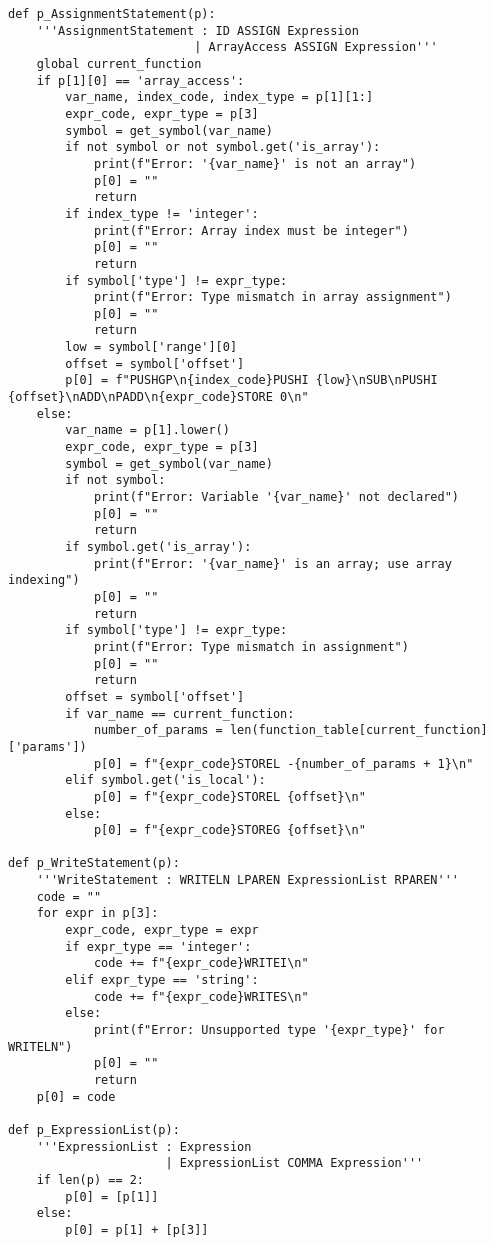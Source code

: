 \documentclass[12pt,a4paper]{report}%
\begin{document}
\begin{lstlisting}[style=pythonStyle, caption={Ficheiro lex.py}]
def p_AssignmentStatement(p):
    '''AssignmentStatement : ID ASSIGN Expression
                          | ArrayAccess ASSIGN Expression'''
    global current_function
    if p[1][0] == 'array_access':
        var_name, index_code, index_type = p[1][1:]
        expr_code, expr_type = p[3]
        symbol = get_symbol(var_name)
        if not symbol or not symbol.get('is_array'):
            print(f"Error: '{var_name}' is not an array")
            p[0] = ""
            return
        if index_type != 'integer':
            print(f"Error: Array index must be integer")
            p[0] = ""
            return
        if symbol['type'] != expr_type:
            print(f"Error: Type mismatch in array assignment")
            p[0] = ""
            return
        low = symbol['range'][0]
        offset = symbol['offset']
        p[0] = f"PUSHGP\n{index_code}PUSHI {low}\nSUB\nPUSHI {offset}\nADD\nPADD\n{expr_code}STORE 0\n"
    else:
        var_name = p[1].lower()
        expr_code, expr_type = p[3]
        symbol = get_symbol(var_name)
        if not symbol:
            print(f"Error: Variable '{var_name}' not declared")
            p[0] = ""
            return
        if symbol.get('is_array'):
            print(f"Error: '{var_name}' is an array; use array indexing")
            p[0] = ""
            return
        if symbol['type'] != expr_type:
            print(f"Error: Type mismatch in assignment")
            p[0] = ""
            return
        offset = symbol['offset']
        if var_name == current_function:
            number_of_params = len(function_table[current_function]['params'])
            p[0] = f"{expr_code}STOREL -{number_of_params + 1}\n"
        elif symbol.get('is_local'):
            p[0] = f"{expr_code}STOREL {offset}\n"
        else:
            p[0] = f"{expr_code}STOREG {offset}\n"

def p_WriteStatement(p):
    '''WriteStatement : WRITELN LPAREN ExpressionList RPAREN'''
    code = ""
    for expr in p[3]:
        expr_code, expr_type = expr
        if expr_type == 'integer':
            code += f"{expr_code}WRITEI\n"
        elif expr_type == 'string':
            code += f"{expr_code}WRITES\n"
        else:
            print(f"Error: Unsupported type '{expr_type}' for WRITELN")
            p[0] = ""
            return
    p[0] = code

def p_ExpressionList(p):
    '''ExpressionList : Expression
                      | ExpressionList COMMA Expression'''
    if len(p) == 2:
        p[0] = [p[1]]
    else:
        p[0] = p[1] + [p[3]]


\end{lstlisting}
\end{document}
